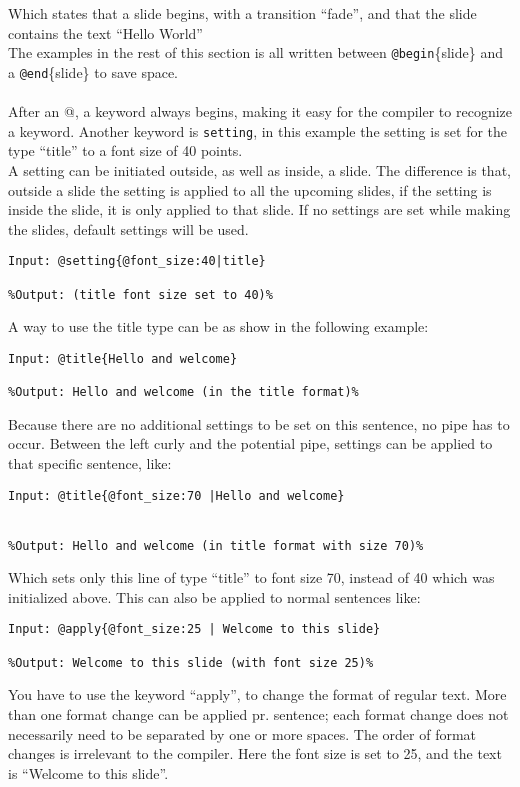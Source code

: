Which states that a slide begins, with a transition ``fade'', and that the slide contains the text ``Hello World'' \\
The examples in the rest of this section is all written between \texttt{@begin}\{slide\} and a \texttt{@end}\{slide\} to save space.
\\ \\
After an @, a keyword always begins, making it easy for the compiler to recognize a keyword.
Another keyword is \texttt{setting}, in this example the setting is set for the type ``title'' to a font size of 40 points. \\
A setting can be initiated outside, as well as inside, a slide. The difference is that, outside a slide the setting is applied to all the upcoming slides, if the setting is inside the slide, it is only applied to that slide. If no settings are set while making the slides, default settings will be used.

\begin{lstlisting}[frame=single]
Input: @setting{@font_size:40|title}

%Output: (title font size set to 40)%
\end{lstlisting}

A way to use the title type can be as show in the following example:\\

\begin{lstlisting}[frame=single]
Input: @title{Hello and welcome}

%Output: Hello and welcome (in the title format)%
\end{lstlisting}

Because there are no additional settings to be set on this sentence, no pipe has to occur. Between the left curly and the potential pipe, settings can be applied to that specific sentence, like: \\

\begin{lstlisting}[frame=single]
Input: @title{@font_size:70 |Hello and welcome}


%Output: Hello and welcome (in title format with size 70)%
\end{lstlisting}
Which sets only this line of type ``title'' to font size 70, instead of 40 which was initialized above.
This can also be applied to normal sentences like:\\

\begin{lstlisting}[frame=single]
Input: @apply{@font_size:25 | Welcome to this slide}

%Output: Welcome to this slide (with font size 25)%
\end{lstlisting}
You have to use the keyword ``apply'', to change the format of regular text. More than one format change can be applied pr. sentence; each format change does not necessarily need to be separated by one or more spaces. The order of format changes is irrelevant to the compiler. Here the font size is set to 25, and the text is ``Welcome to this slide''.

